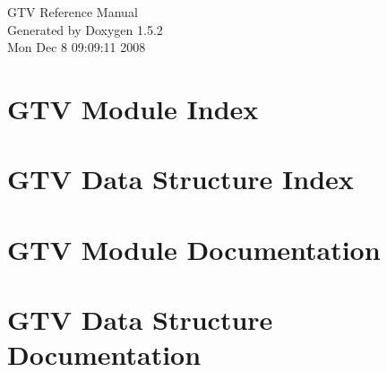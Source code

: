 \documentclass[a4paper]{book}
\begin{document}
\begin{titlepage}
\vspace*{7cm}
\begin{center}
{\Large GTV Reference Manual}\\
\vspace*{1cm}
{\large Generated by Doxygen 1.5.2}\\
\vspace*{0.5cm}
{\small Mon Dec 8 09:09:11 2008}\\
\end{center}
\end{titlepage}
\clearemptydoublepage
{}
\tableofcontents
\clearemptydoublepage
{}
\chapter{GTV Module Index}

\chapter{GTV Data Structure Index}

\chapter{GTV Module Documentation}













\chapter{GTV Data Structure Documentation}













\printindex
\end{document}
